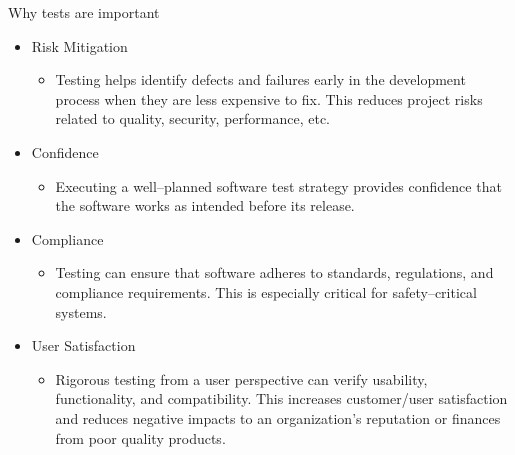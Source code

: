 \documentclass[
  ignorenonframetext,
  american,
  t,
  aspectratio=169]{beamer}
\providecommand{\tightlist}{%
  \setlength{\itemsep}{0pt}\setlength{\parskip}{0pt}}
\begin{document}
\begin{frame}{Why tests are important}
\protect{}\label{why-tests-are-important}
\begin{itemize}
\tightlist
\item
  Risk Mitigation

  \begin{itemize}
  \tightlist
  \item
    Testing helps identify defects and failures early in the development
    process when they are less expensive to fix. This reduces project
    risks related to quality, security, performance, etc.
  \end{itemize}
\item
  Confidence

  \begin{itemize}
  \tightlist
  \item
    Executing a well–planned software test strategy provides confidence
    that the software works as intended before its release.
  \end{itemize}
\item
  Compliance

  \begin{itemize}
  \tightlist
  \item
    Testing can ensure that software adheres to standards, regulations,
    and compliance requirements. This is especially critical for
    safety–critical systems.
  \end{itemize}
\item
  User Satisfaction

  \begin{itemize}
  \tightlist
  \item
    Rigorous testing from a user perspective can verify usability,
    functionality, and compatibility. This increases customer/user
    satisfaction and reduces negative impacts to an organization’s
    reputation or finances from poor quality products.
  \end{itemize}
\end{itemize}
\end{frame}
\end{document}
